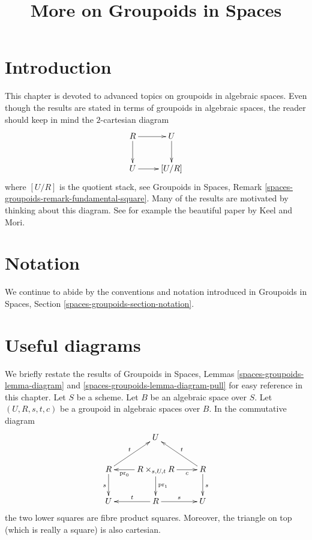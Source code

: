 \documentclass{stacks-project}
\theoremstyle{plain}
\theoremstyle{definition}
\theoremstyle{remark}
\numberwithin{equation}{subsection}
\begin{document}
\title{More on Groupoids in Spaces}


\maketitle

\label{section-phantom}

\tableofcontents

\section{Introduction}
\label{section-introduction}

\noindent
This chapter is devoted to advanced topics on groupoids
in algebraic spaces.
Even though the results are stated in terms of groupoids in
algebraic spaces, the
reader should keep in mind the $2$-cartesian diagram
\begin{equation}
\label{equation-quotient-stack}
\vcenter{
\xymatrix{
R \ar[r] \ar[d] & U \ar[d] \\
U \ar[r] & [U/R]
}
}
\end{equation}
where $[U/R]$ is the quotient stack, see
Groupoids in Spaces, Remark \ref{spaces-groupoids-remark-fundamental-square}.
Many of the results are motivated by thinking about this diagram.
See for example the beautiful paper \cite{K-M} by Keel and Mori.





\section{Notation}
\label{section-notation}

\noindent
We continue to abide by the conventions and notation introduced in
Groupoids in Spaces, Section \ref{spaces-groupoids-section-notation}.





\section{Useful diagrams}
\label{section-diagrams}

\noindent
We briefly restate the results of
Groupoids in Spaces, Lemmas \ref{spaces-groupoids-lemma-diagram} and
\ref{spaces-groupoids-lemma-diagram-pull}
for easy reference in this chapter.
Let $S$ be a scheme. Let $B$ be an algebraic space over $S$.
Let $(U, R, s, t, c)$ be a groupoid in algebraic spaces over $B$.
In the commutative diagram
\begin{equation}
\label{equation-diagram}
\vcenter{
\xymatrix{
& U & \\
R \ar[d]_s \ar[ru]^t &
R \times_{s, U, t} R
\ar[l]^-{\text{pr}_0} \ar[d]^{\text{pr}_1} \ar[r]_-c &
R \ar[d]^s \ar[lu]_t \\
U & R \ar[l]_t \ar[r]^s & U
}
}
\end{equation}
the two lower squares are fibre product squares.
Moreover, the triangle on top (which is really a square)
is also cartesian.
\end{document}
